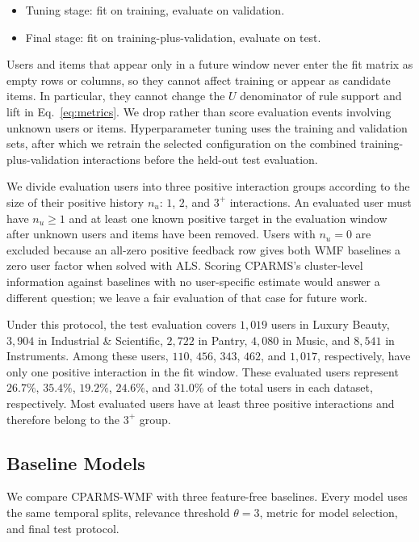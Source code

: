 \documentclass[pdflatex,sn-vancouver-num]{sn-jnl}%
\theoremstyle{thmstyleone}%
\theoremstyle{thmstyletwo}%
\theoremstyle{thmstylethree}%
\begin{document}
\begin{itemize}
\item Tuning stage: fit on training, evaluate on validation.

\item Final stage: fit on training-plus-validation, evaluate on test.
\end{itemize}

Users and items that appear only in a future window never enter the fit matrix as empty rows or columns, so they cannot affect training or appear as candidate items. In particular, they cannot change the $U$ denominator of rule support and lift in Eq.~\eqref{eq:metrics}. We drop rather than score evaluation events involving unknown users or items. Hyperparameter tuning uses the training and validation sets, after which we retrain the selected configuration on the combined training-plus-validation interactions before the held-out test evaluation.

We divide evaluation users into three positive interaction groups according to the size of their positive history $n_u$: $1$, $2$, and $3^{+}$ interactions. An evaluated user must have $n_u \ge 1$ and at least one known positive target in the evaluation window after unknown users and items have been removed. Users with $n_u = 0$ are excluded because an all-zero positive feedback row gives both WMF baselines a zero user factor when solved with ALS. Scoring CPARMS's cluster-level information against baselines with no user-specific estimate would answer a different question; we leave a fair evaluation of that case for future work.

Under this protocol, the test evaluation covers $1{,}019$ users in Luxury Beauty, $3{,}904$ in Industrial \& Scientific, $2{,}722$ in Pantry, $4{,}080$ in Music, and $8{,}541$ in Instruments. Among these users, $110$, $456$, $343$, $462$, and $1{,}017$, respectively, have only one positive interaction in the fit window. These evaluated users represent $26.7\%$, $35.4\%$, $19.2\%$, $24.6\%$, and $31.0\%$ of the total users in each dataset, respectively. Most evaluated users have at least three positive interactions and therefore belong to the $3^{+}$ group.

\subsection{Baseline Models}\label{sec4_baselines}

We compare CPARMS-WMF with three feature-free baselines. Every model uses the same temporal splits, relevance threshold $\theta=3$, metric for model selection, and final test protocol.
\end{document}
